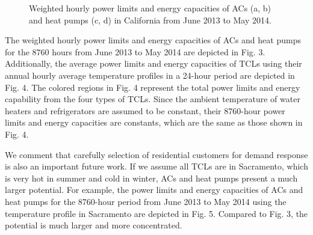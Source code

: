 \documentclass[onecolumn,journal]{IEEEtran}
\newcommand{\cut}[1]{}
\begin{document}
\begin{figure}[tb]
\centering
{}
\caption{Weighted hourly power limits and energy capacities of ACs (a, b) and heat pumps (c, d) in California from June 2013 to May 2014. }\label{fig:yearly_capacity}
\end{figure}

The weighted hourly power limits and energy capacities of ACs and heat pumps for the 8760 hours from June 2013 to May 2014 are depicted in Fig.  3. Additionally, the average power limits and energy capacities of \acp{TCL} using their annual hourly average temperature profiles in a 24-hour period are depicted in Fig.  4. The colored regions in Fig.  4 represent the total power limits and energy capability from the four types of TCLs. Since the ambient temperature of water heaters and refrigerators are assumed to be constant, their 8760-hour power limits and energy capacities are constants, which are the same as those shown in Fig.  4. 

\cut{
\begin{figure}[tb]
\centering
\subfigure[Regulation up power limit]{\texttt{[image: figures/Power\_UP.eps]}}
\subfigure[Regulation down power limit]{\texttt{[image: figures/Power\_DOWN.eps]}}
\subfigure[Energy Capacity]{\texttt{[image: figures/Capacity.eps]}}
\caption{Hourly average upward (a), downward (b) power limits, and energy capacity (c) of TCLs in California  from June 2013 to May 2014. }
\label{fig:est_capacity}
\end{figure}
}

We comment that carefully selection of residential customers for demand response is also an important future work. If we assume all TCLs are in Sacramento, which is very hot in summer and cold in winter, ACs and heat pumps present a much larger potential. For example, the power limits and energy capacities of ACs and heat pumps for the 8760-hour period from June 2013 to May 2014 using the temperature profile in Sacramento are depicted in Fig.  5. Compared to Fig.  3, the potential is much larger and more concentrated. 
\end{document}
